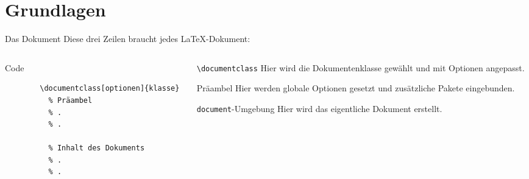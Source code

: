\section{Grundlagen}

\begin{frame}[fragile]{Das Dokument}
  Diese drei Zeilen braucht jedes \LaTeX-Dokument:
  \begin{columns}[onlytextwidth, t]
    \begin{column}{0.48\textwidth}
      \begin{block}{Code}
        \begin{lstlisting}
        \documentclass[optionen]{klasse}
          % Präambel
          % .
          % .
        
          % Inhalt des Dokuments
          % .
          % .
        
        \end{lstlisting}
      \end{block}
    \end{column}
    \begin{column}{0.48\textwidth}
      \begin{block}{\texttt{\textbackslash documentclass}}
        Hier wird die Dokumentenklasse gewählt und mit Optionen angepasst.
      \end{block}
      \begin{block}{Präambel}
        Hier werden globale Optionen gesetzt und zusätzliche Pakete eingebunden.
      \end{block}
      \begin{block}{\texttt{document}-Umgebung}
        Hier wird das eigentliche Dokument erstellt.
      \end{block}
    \end{column}
  \end{columns}
\end{frame}

